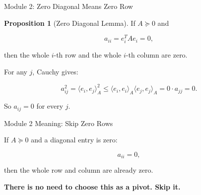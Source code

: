 \documentclass[10pt]{beamer}
\theoremstyle{definition}
\newtheorem{prop}{Proposition}[section]
\newcommand{\x}[1]{\alert{\textbf{#1}}}
\newcommand{\rd}[1]{{\color{red!70!black}#1}}
\begin{document}
\begin{frame}{Module 2: Zero Diagonal Means Zero Row}

\begin{prop}[Zero Diagonal Lemma]
If $A\succeq0$ and

$$
a_{ii}=e_i^TAe_i=0,
$$

then the whole $i$-th row and the whole $i$-th column are zero.
\end{prop}

\vfill

For any $j$, Cauchy gives:

$$
a_{ij}^2
=\langle e_i,e_j\rangle_A^2
\le
\langle e_i,e_i\rangle_A\langle e_j,e_j\rangle_A
=0\cdot a_{jj}=0.
$$

\vfill

So $a_{ij}=0$ for every $j$.

\end{frame}


\begin{frame}{Module 2 Meaning: Skip Zero Rows}

If $A\succeq0$ and a diagonal entry is zero:

$$
a_{ii}=0,
$$

then the whole row and column are already zero.

\vfill

\begin{center}
\end{center}

\vfill

\begin{center}
\x{There is no need to choose this as a pivot. Skip it.}
\end{center}

\end{frame}
\end{document}
